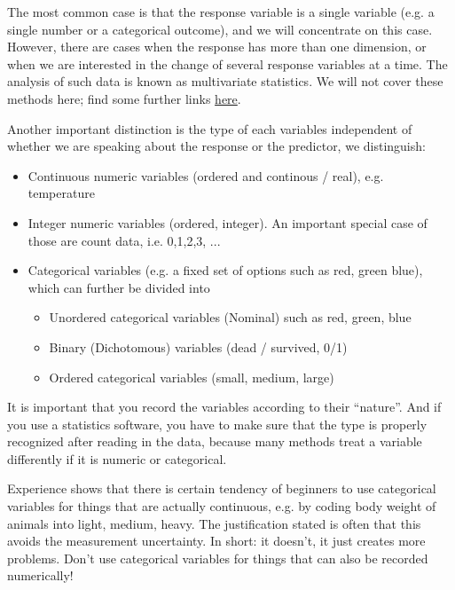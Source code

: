 \documentclass[a4paper,twoside]{tufte-book}\usepackage[]{graphicx}\usepackage[]{color}
\begin{document}
The most common case is that the response variable is a single variable (e.g. a single number or a categorical outcome), and we will concentrate on this case. However, there are cases when the response has more than one dimension, or when we are interested in the change of several response variables at a time. The analysis of such data is known as multivariate statistics. We will not cover these methods here; find some further links \href{http://biometry.github.io/APES/Stats/stats50-MultivariateStatistics.html}{here}.

Another important distinction is the type of each variables independent of whether we are speaking about the response or the predictor, we distinguish: 

\begin{itemize}
\item Continuous numeric variables (ordered and continous / real), e.g. temperature
\item Integer numeric variables (ordered, integer). An important special case of those are count data, i.e. 0,1,2,3, ...
\item Categorical variables (e.g. a fixed set of options such as red, green blue), which can further be divided into
\begin{itemize}
\item Unordered categorical variables (Nominal) such as red, green, blue 
\item Binary (Dichotomous) variables (dead / survived, 0/1)
\item Ordered categorical variables (small, medium, large)
\end{itemize}
\end{itemize}

It is important that you record the variables according to their ``nature''. And if you use a statistics software, you have to make sure that the type is properly recognized after reading in the data, because many methods treat a variable differently if it is numeric or categorical.

Experience shows that there is certain tendency of beginners to use categorical variables for things that are actually continuous, e.g. by coding body weight of animals into light, medium, heavy. The justification stated is often that this avoids the measurement uncertainty. In short: it doesn't, it just creates more problems. Don't use categorical variables for things that can also be recorded numerically! 
\end{document}
